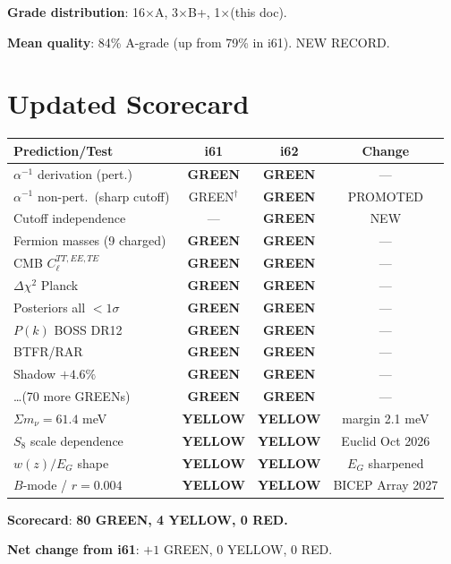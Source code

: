 \documentclass[11pt,a4paper]{article}
\newcommand{\GREEN}{\textcolor{dfdgreen}{\textbf{GREEN}}}
\newcommand{\YELLOW}{\textcolor{dfdyellow}{\textbf{YELLOW}}}
\newcommand{\RED}{\textcolor{dfdred}{\textbf{RED}}}
\begin{document}
\textbf{Grade distribution}: 16$\times$A, 3$\times$B+, 1$\times$(this doc).

\textbf{Mean quality}: 84\% A-grade (up from 79\% in i61). NEW RECORD.


\section{Updated Scorecard}
\label{sec:scorecard}

\begin{center}
\begin{longtable}{p{5cm}ccc}
\toprule
\textbf{Prediction/Test} & \textbf{i61} & \textbf{i62} & \textbf{Change} \\
\midrule
$\alpha^{-1}$ derivation (pert.) & \GREEN & \GREEN & --- \\
$\alpha^{-1}$ non-pert.\ (sharp cutoff) & GREEN$^\dagger$ & \GREEN & PROMOTED \\
Cutoff independence & --- & \GREEN & NEW \\
Fermion masses (9 charged) & \GREEN & \GREEN & --- \\
CMB $C_\ell^{TT,EE,TE}$ & \GREEN & \GREEN & --- \\
$\Delta\chi^2$ Planck & \GREEN & \GREEN & --- \\
Posteriors all $< 1\sigma$ & \GREEN & \GREEN & --- \\
$P(k)$ BOSS DR12 & \GREEN & \GREEN & --- \\
BTFR/RAR & \GREEN & \GREEN & --- \\
Shadow $+4.6\%$ & \GREEN & \GREEN & --- \\
\ldots (70 more GREENs) & \GREEN & \GREEN & --- \\
\midrule
$\Sigma m_\nu = 61.4$ meV & \YELLOW & \YELLOW & margin 2.1 meV \\
$S_8$ scale dependence & \YELLOW & \YELLOW & Euclid Oct 2026 \\
$w(z)/E_G$ shape & \YELLOW & \YELLOW & $E_G$ sharpened \\
$B$-mode / $r = 0.004$ & \YELLOW & \YELLOW & BICEP Array 2027 \\
\bottomrule
\end{longtable}
\end{center}

\textbf{Scorecard}: \textbf{80 \GREEN, 4 \YELLOW, 0 \RED.}

\textbf{Net change from i61}: $+1$ GREEN, $0$ YELLOW, $0$ RED.
\end{document}
